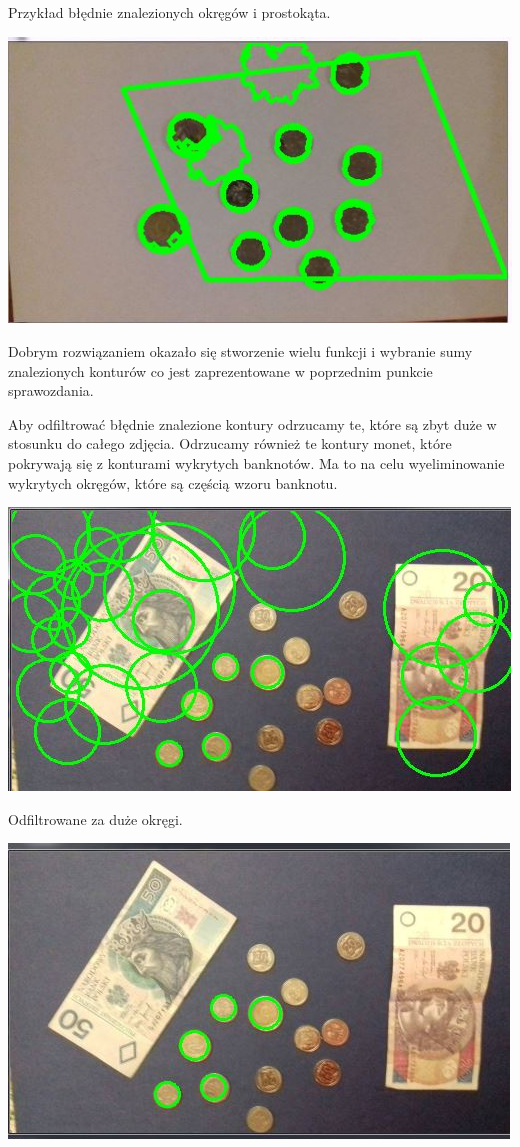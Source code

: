 \documentclass[12pt]{article}
\begin{document}
Przykład błędnie znalezionych okręgów i prostokąta.

\includegraphics[scale=0.8]{dziwnyRownoleglobok}

Dobrym rozwiązaniem okazało się stworzenie wielu funkcji i wybranie sumy znalezionych konturów co jest zaprezentowane w poprzednim punkcie sprawozdania. 

Aby odfiltrować błędnie znalezione kontury odrzucamy te, które są zbyt duże w stosunku do całego zdjęcia. Odrzucamy również te kontury monet, które pokrywają się z konturami wykrytych banknotów. Ma to na celu wyeliminowanie wykrytych okręgów, które są częścią wzoru banknotu.

\includegraphics[scale=0.8]{zaduzo}

Odfiltrowane za duże okręgi.

\includegraphics[scale=0.8]{bezzaduzo}
\end{document}
